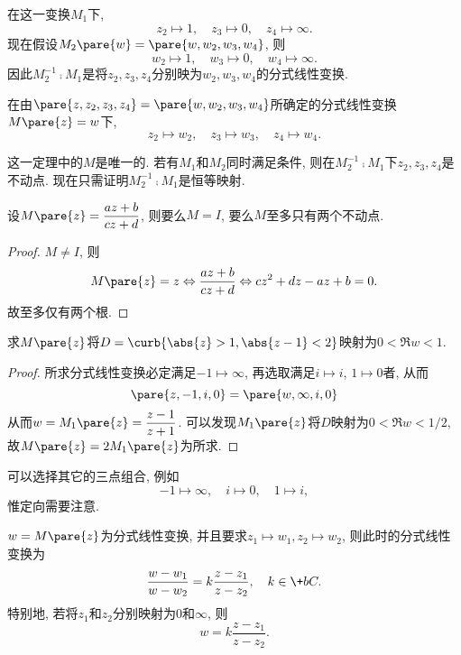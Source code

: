 \documentclass{ctexart}
\begin{document}
在这一变换$M_1$下,
\[ z_2 \mapsto 1,\quad z_3\mapsto 0,\quad z_4\mapsto \infty. \]
现在假设$M_2\pare{w}=\pare{w,w_2,w_3,w_4}$, 则
\[ w_2 \mapsto 1,\quad w_3\mapsto 0,\quad w_4\mapsto \infty. \]
因此$M_2^{-1}\comp M_1$是将$z_2,z_3,z_4$分别映为$w_2,w_3,w_4$的分式线性变换.
\begin{theorem}
    在由$\pare{z,z_2,z_3,z_4} = \pare{w,w_2,w_3,w_4}$所确定的分式线性变换$M\pare{z} = w$下,
    \[ z_2 \mapsto w_2, \quad z_3\mapsto w_3,\quad z_4\mapsto w_4. \]
\end{theorem}
\begin{remark}
    这一定理中的$M$是唯一的. 若有$M_1$和$M_2$同时满足条件, 则在$M_2^{-1}\comp M_1$下$z_2,z_3,z_4$是不动点. 现在只需证明$M_2^{-1}\comp M_1$是恒等映射.
\end{remark}
\begin{lemma}
    设$M\pare{z} = \displaystyle \frac{az+b}{cz+d}$, 则要么$M=I$, 要么$M$至多只有两个不动点.
\end{lemma}
\begin{proof}
    $M\neq I$, 则
    \[ M\pare{z} = z \Leftrightarrow \frac{az+b}{cz+d} \Leftrightarrow cz^2 + dz-az+b = 0. \]
    故至多仅有两个根.
\end{proof}
\begin{sample}
    \begin{ex}
        求$M\pare{z}$将$D = \curb{\abs{z}>1, \abs{z-1}<2}$映射为$0<\Re w<1$.
    \end{ex}
    \begin{proof}
        所求分式线性变换必定满足$-1\mapsto \infty$, 再选取满足$i\mapsto i$, $1\mapsto 0$者, 从而
        \[ \pare{z, -1, i, 0} = \pare{w,\infty, i, 0} \]
        从而$w = M_1\pare{z} = \displaystyle \frac{z-1}{z+1}$. 可以发现$M_1\pare{z}$将$D$映射为$0 < \Re w < 1/2$, 故$M\pare{z} = 2M_1\pare{z}$为所求.
    \end{proof}
    \begin{remark}
        可以选择其它的三点组合, 例如
        \[ -1\mapsto\infty,\quad i\mapsto 0,\quad 1\mapsto i, \]
        惟定向需要注意.
    \end{remark}
\end{sample}
\begin{corollary}
    $w=M\pare{z}$为分式线性变换, 并且要求$z_1\mapsto w_1, z_2\mapsto w_2$, 则此时的分式线性变换为
    \[ \frac{w-w_1}{w-w_2} = k \frac{z-z_1}{z-z_2},\quad k\in \+bC. \]
    特别地, 若将$z_1$和$z_2$分别映射为$0$和$\infty$, 则
    \[ w = k \frac{z-z_1}{z-z_2}. \]
\end{corollary}
\end{document}
